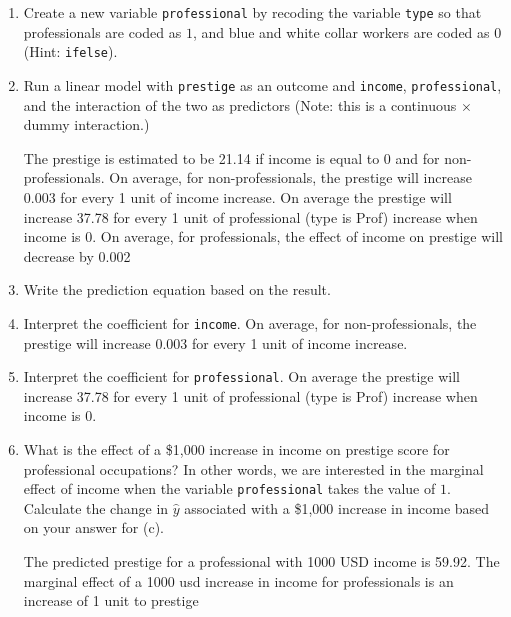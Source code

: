 \documentclass[12pt,letterpaper]{article}
\begin{document}
\newpage
\begin{enumerate}
	
	\item [(a)]
	Create a new variable \texttt{professional} by recoding the variable \texttt{type} so that professionals are coded as $1$, and blue and white collar workers are coded as $0$ (Hint: \texttt{ifelse}).
	
	
	
	\item [(b)]
	Run a linear model with \texttt{prestige} as an outcome and \texttt{income}, \texttt{professional}, and the interaction of the two as predictors (Note: this is a continuous $\times$ dummy interaction.)
	
	
	\noindent The prestige is estimated to be 21.14 if income is equal to 0 and for non-professionals. On average, for non-professionals, the prestige will increase 0.003 for every 1 unit of income increase. On average the prestige will increase 37.78 for every 1 unit of professional (type is Prof) increase when income is 0. On average, for professionals, the effect of income on prestige will decrease by 0.002 
	
	\item [(c)]
	Write the prediction equation based on the result.
	
\newpage
	\item [(d)]
	Interpret the coefficient for \texttt{income}.
	\newline
	\noindent On average, for non-professionals, the prestige will increase 0.003 for every 1 unit of income increase.
	\item [(e)]
	Interpret the coefficient for \texttt{professional}.
	\newline
	\noindent On average the prestige will increase 37.78 for every 1 unit of professional (type is Prof) increase when income is 0.
	\item [(f)]
	What is the effect of a \$1,000 increase in income on prestige score for professional occupations? In other words, we are interested in the marginal effect of income when the variable \texttt{professional} takes the value of $1$. Calculate the change in $\hat{y}$ associated with a \$1,000 increase in income based on your answer for (c).
	
	\noindent The predicted prestige for a professional with 1000 USD income is 59.92. The marginal effect of a 1000 usd increase in income for professionals is an increase of 1 unit to prestige
	

\end{enumerate}
\end{document}
